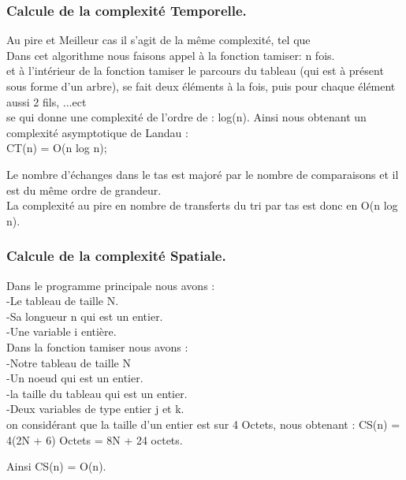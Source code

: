 \documentclass[12pt]{article}
\begin{document}
\subsubsection{Calcule de la complexité Temporelle. }
Au pire et Meilleur cas il s'agit de la même complexité, tel que\\

Dans cet algorithme nous faisons appel à la fonction tamiser: \color{blue} n fois.\color{black}\\
 et à l'intérieur de la fonction tamiser le parcours du tableau (qui est à présent sous forme d'un arbre), se fait deux éléments à la fois, puis pour chaque élément aussi 2 fils, ...ect\\
se qui donne une complexité de l'ordre de :\color{blue} log(n).\color{black}
Ainsi nous obtenant un complexité asymptotique de Landau :\\
\color{blue}
CT(n) = O(n log n);\\
\color{black}

Le nombre d'échanges dans le tas est majoré par le nombre de comparaisons et il est du même ordre de grandeur.\\
La complexité au pire en nombre de transferts du tri par tas est donc en \color{blue} O(n log n). \color{black}



\subsubsection{Calcule de la complexité Spatiale.}
Dans le programme principale nous avons :\\
-Le tableau de taille N.\\
-Sa longueur n qui est un entier.\\
-Une variable i entière.\\

Dans la fonction tamiser nous avons : \\
-Notre tableau de taille N\\
-Un noeud qui est un entier.\\
-la taille du tableau qui est un entier.\\
-Deux variables de type entier j et k.\\

	on considérant que la taille d'un entier est sur 4 Octets, 
	nous obtenant : \color{blue} CS(n) = 4(2N + 6) Octets = 8N + 24 octets.\color{black}
	
	Ainsi \color{blue} CS(n) = O(n). \color{black}
\end{document}
